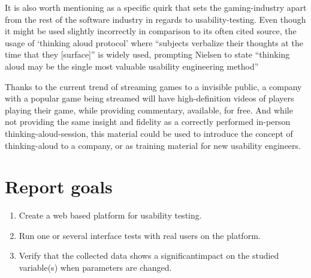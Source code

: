   It is also worth mentioning as a specific quirk that sets the gaming-industry
  apart from the rest of the software industry in regards to usability-testing.
  Even though it might be used slightly incorrectly\cite{citeThinkAloud} in
  comparison to its often cited source\cite{ProtocolanalysisVerbalReportsAsData},
  the usage of `thinking aloud protocol' where ``subjects verbalize their
  thoughts at the time that they [surface]''%
  \cite[p. 60]{ProtocolanalysisVerbalReportsAsData}
  is widely used, prompting Nielsen to state ``thinking aloud may be the single
  most valuable usability engineering
  method''\cite[p. 195]{citeHeuristicsNielsenUsabilityEngineering}

  Thanks to the current trend of streaming games to a invisible public, a
  company with a popular game being streamed will have high-definition videos
  of players playing their game, while providing commentary, available, for
  free. And while not providing the same insight and fidelity as a correctly
  performed in-person thinking-aloud-session, this material could be used to
  introduce the concept of thinking-aloud to a company, or as training
  material for new usability
  engineers\cite{citeYouTubeGamersandThinkAloudProtocolsIntroducingUsabilityTesting}.








\section{Report goals}

  \begin{enumerate}
    \item{Create a web based platform for usability testing.}
    \item{Run one or several interface tests with real users on the platform.}
    \item{
      Verify that the collected data shows a significant\checkTruth impact on the studied
      variable(s) when parameters are changed. 
    }
  \end{enumerate}

